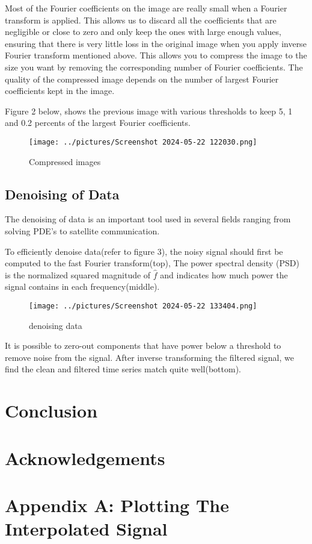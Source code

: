 \documentclass[11pt]{amsart}
\theoremstyle{definition}
\theoremstyle{remark}
\numberwithin{equation}{section}
\begin{document}
Most of the Fourier coefficients on the image are really small when a Fourier transform is applied. This allows us to discard all the coefficients that are negligible or close to zero and only keep the ones with large enough values, ensuring that there is very little loss in the original image when you apply inverse Fourier transform mentioned above. This allows you to compress the image to the size you want by removing the corresponding number of Fourier coefficients. The quality of the compressed image depends on the number of largest Fourier coefficients kept in the image. 

Figure 2 below, shows the previous image with various thresholds to keep 5, 1 and 0.2 percents of the largest Fourier coefficients.
 \begin{figure} [h]
     \centering
     \texttt{[image: ../pictures/Screenshot 2024-05-22 122030.png]}
     \caption{Compressed images} \label{fig:2}
 \end{figure}

 \subsection{Denoising of Data} 
 The denoising of data is an important tool used in several fields ranging from solving PDE's to satellite communication. 

 To efficiently denoise data(refer to figure 3), the noisy signal should first be computed to the fast Fourier transform(top), The power spectral density (PSD) is the normalized squared magnitude of $\hat{f}$ and indicates how much power the signal contains in each frequency(middle). 
\begin{figure}[t]
    \centering
    \texttt{[image: ../pictures/Screenshot 2024-05-22 133404.png]}
    \caption{denoising data}
    \label{fig:3}
\end{figure}

It is possible to zero-out components that have power below a threshold to remove noise from the signal. After inverse transforming the filtered signal, we find the clean and filtered time series match quite well(bottom).

\section{Conclusion}


\section*{Acknowledgements}

\appendix

\section{Appendix A: Plotting The Interpolated Signal}\label{appA}



\cite{Olver2015TopicsIF}
\cite{Brunton_Kutz_2022}
\cite{Strang2019}
\end{document}
